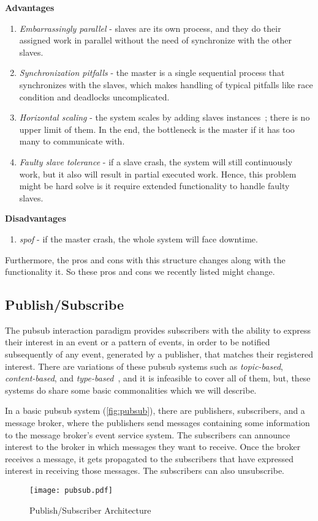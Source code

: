 \textbf{Advantages}
\begin{enumerate}
    \item \emph{Embarrassingly parallel} - slaves are its own process, and they do their assigned work in parallel without the need of synchronize with the other slaves.
    
    \item \emph{Synchronization pitfalls} - the master is a single sequential process that synchronizes with the slaves, which makes handling of typical pitfalls like race condition and deadlocks uncomplicated.

    \item \emph{Horizontal scaling} - the system scales by adding slaves instances~\cite{ms_hor}; there is no upper limit of them. In the end, the bottleneck is the master if it has too many to communicate with.
    
    \item \emph{Faulty slave tolerance} - if a slave crash, the system will still continuously work, but it also will result in partial executed work. Hence, this problem might be hard solve is it require extended functionality to handle faulty slaves.
\end{enumerate}

\textbf{Disadvantages}
\begin{enumerate}
    \item \emph{\Ac{spof}} - if the master crash, the whole system will face downtime.
\end{enumerate}
Furthermore, the pros and cons with this structure changes along with the functionality it. So these pros and cons we recently listed might change.

\subsection{Publish/Subscribe}
The \ac{pubsub} interaction paradigm provides subscribers with the ability to express their interest in an event or a pattern of events, in order to be notified subsequently of any event, generated by a publisher, that matches their registered interest. There are variations of these \ac{pubsub} systems such as \emph{topic-based}, \emph{content-based}, and \emph{type-based}~\cite{eugster2003many}, and it is infeasible to cover all of them, but, these systems do share some basic commonalities which we will describe.

In a basic \ac{pubsub} system (\autoref{fig:pubsub}), there are publishers, subscribers, and a message broker, where the publishers send messages containing some information to the message broker's event service system. The subscribers can announce interest to the broker in which messages they want to receive. Once the broker receives a message, it gets propagated to the subscribers that have expressed interest in receiving those messages. The subscribers can also unsubscribe.
\begin{figure}[ht]
    \centering
    \texttt{[image: pubsub.pdf]}
    \caption{Publish/Subscriber Architecture}
    \label{fig:pubsub}
\end{figure}

